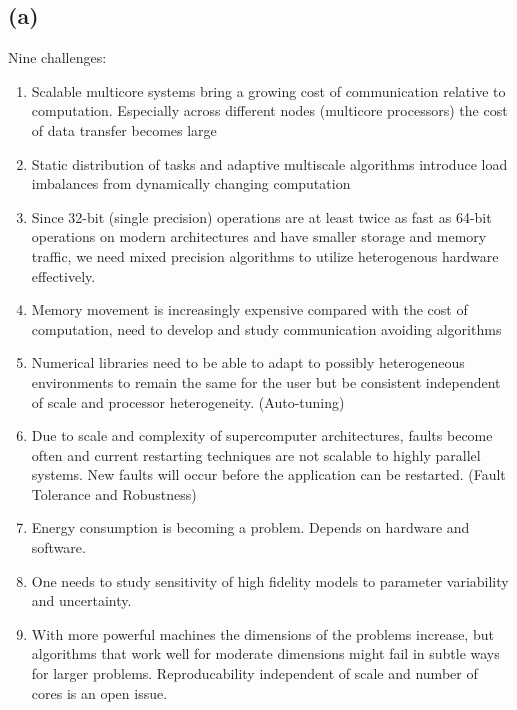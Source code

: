 \subsection*{(a)}
Nine challenges:
\begin{enumerate}
\item Scalable multicore systems bring a growing cost of communication relative to computation. Especially across different nodes (multicore processors) the cost of data transfer becomes large
\item Static distribution of tasks and adaptive multiscale algorithms introduce load imbalances from dynamically changing computation
\item Since 32-bit (single precision) operations are at least twice as fast as 64-bit operations on modern architectures and have smaller storage and memory traffic, we need mixed precision algorithms to utilize heterogenous hardware effectively.
\item Memory movement is increasingly expensive compared with the cost of computation, need to develop and study communication avoiding algorithms
\item Numerical libraries need to be able to adapt to possibly heterogeneous environments to remain the same for the user but be consistent independent of scale and processor heterogeneity. (Auto-tuning)
\item Due to scale and complexity of supercomputer architectures, faults become often and current restarting techniques are not scalable to highly parallel systems. New faults will occur  before the application can be restarted. (Fault Tolerance and Robustness)
\item Energy consumption is becoming a problem. Depends on hardware and software.
\item One needs to study sensitivity of high fidelity models to parameter variability and uncertainty.
\item With more powerful machines the dimensions of the problems increase, but algorithms that work well for moderate dimensions might fail in subtle ways for larger problems. Reproducability independent of scale and number of cores is an open issue.
\end{enumerate}

